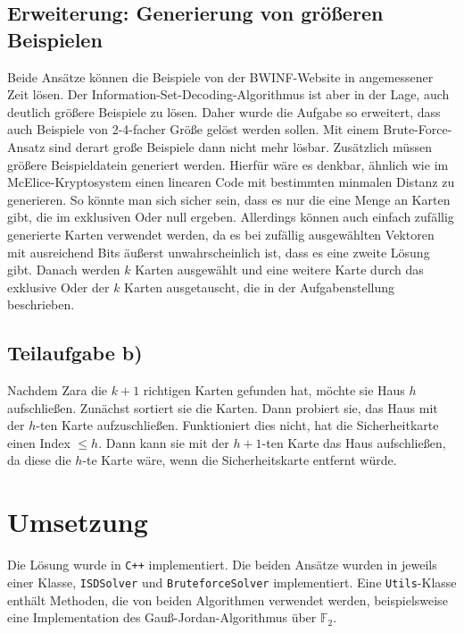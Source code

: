 \documentclass[a4paper,10pt,ngerman]{scrartcl}
\begin{document}
\subsection{Erweiterung: Generierung von größeren Beispielen}
Beide Ansätze können die Beispiele von der BWINF-Website in angemessener Zeit lösen.
Der Information-Set-Decoding-Algorithmus ist aber in der Lage, auch deutlich größere Beispiele zu lösen. Daher wurde die Aufgabe so erweitert, dass auch Beispiele von 2-4-facher Größe gelöst werden sollen. Mit einem Brute-Force-Ansatz sind derart große Beispiele dann nicht mehr lösbar. Zusätzlich müssen größere Beispieldatein generiert werden.
Hierfür wäre es denkbar, ähnlich wie im McElice-Kryptosystem einen linearen Code mit bestimmten minmalen Distanz zu generieren. 
So könnte man sich sicher sein, dass es nur die eine Menge an Karten gibt, die im exklusiven Oder null ergeben. 
Allerdings können auch einfach zufällig generierte Karten verwendet werden, da es bei zufällig ausgewählten Vektoren mit ausreichend Bits äußerst unwahrscheinlich ist, dass es eine zweite Lösung gibt. 
Danach werden $k$ Karten ausgewählt und eine weitere Karte durch das exklusive Oder der $k$ Karten ausgetauscht, die in der Aufgabenstellung beschrieben.

\subsection{Teilaufgabe b)}
Nachdem Zara die $k+1$ richtigen Karten gefunden hat, möchte sie Haus $h$ aufschließen. Zunächst sortiert sie die Karten. Dann probiert sie, das Haus mit der $h$-ten Karte aufzuschließen. Funktioniert dies nicht, hat die Sicherheitkarte einen Index $\leq h$. Dann kann sie mit der $h+1$-ten Karte das Haus aufschließen, da diese die $h$-te Karte wäre, wenn die Sicherheitskarte entfernt würde.
\section{Umsetzung}
Die Lösung wurde in \texttt{C++} implementiert. Die beiden Ansätze wurden in jeweils einer Klasse, \lstinline{ISDSolver} und \lstinline{BruteforceSolver} implementiert. Eine \lstinline{Utils}-Klasse enthält Methoden, die von beiden Algorithmen verwendet werden, beispielsweise eine Implementation des Gauß-Jordan-Algorithmus über $\mathbb{F}_2$.
\end{document}
